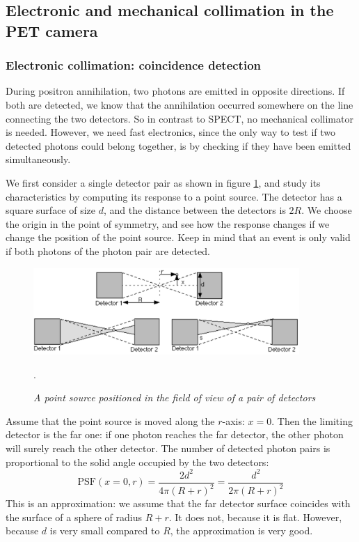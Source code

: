 \documentclass[11pt,oneside]{book}
\begin{document}
\subsection{Electronic and mechanical collimation in the PET camera} \label{sec:petcollim}
\subsubsection{Electronic collimation: coincidence detection}
During positron annihilation, two photons are emitted in opposite
directions. If both are detected, we know that the annihilation occurred
somewhere on the line connecting the two detectors. So in contrast to SPECT,
no mechanical collimator is needed. However, we need fast electronics, since
the only way to test if two detected photons could belong together, is by
checking if they have been emitted simultaneously.

We first consider a single detector pair as shown in figure
\ref{fig:petdetectorpair}, and study its characteristics by computing its
response to a point source. The detector has a square surface of size $d$, and
the distance between the detectors is $2R$. We choose the origin in the point of
symmetry, and see how the response changes if we change the position of the
point source. Keep in mind that an event is only valid if both photons of the
photon pair are detected.
%
\begin{figure}[tb]
\centering
\includegraphics[width=0.9\textwidth]{figs/fig_petdetectorpair.pdf}
\caption{\label{fig:petdetectorpair} \emph{A point source positioned in the
field of view of a pair of detectors}}.
\end{figure}

Assume that the point source is moved along the $r$-axis: $x = 0$. Then the
limiting detector is the far one: if one photon reaches the far detector, the
other photon will surely reach the other detector. The number of detected
photon pairs is proportional to the solid angle occupied by the two detectors:
\begin{equation}
  \mbox{PSF}(x=0, r) = \frac{2 d^2}{4 \pi (R+r)^2} = \frac{d^2}{2 \pi (R+r)^2}
\end{equation}
This is an approximation: we assume that the far detector surface coincides
with the surface of a sphere of radius $R+r$. It does not, because it is flat.
However, because $d$ is very small compared to $R$, the approximation is very
good.
\end{document}
